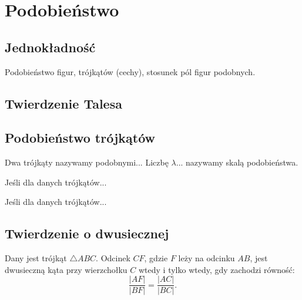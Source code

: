 %

\chapter{Podobieństwo}
\section{Jednokładność}
Podobieństwo figur, trójkątów (cechy), stosunek pól figur podobnych.

\section{Twierdzenie Talesa}


\section{Podobieństwo trójkątów}
\begin{definition}
	Dwa trójkąty nazywamy podobnymi...
	Liczbę $\lambda$... nazywamy skalą podobieństwa.
\end{definition}

\begin{proposition}
	Jeśli dla danych trójkątów...
\end{proposition}

\begin{proposition}
	Jeśli dla danych trójkątów...
\end{proposition}




\section{Twierdzenie o dwusiecznej}

\begin{proposition}
	Dany jest trójkąt $\triangle ABC$.
	Odcinek $CF$, gdzie $F$ leży na odcinku $AB$, jest dwusieczną kąta przy wierzchołku $C$ wtedy i tylko wtedy, gdy zachodzi równość:
	\begin{equation}
		\frac{|AF|}{|BF|} = \frac{|AC|}{|BC|}.
	\end{equation}
\end{proposition}

